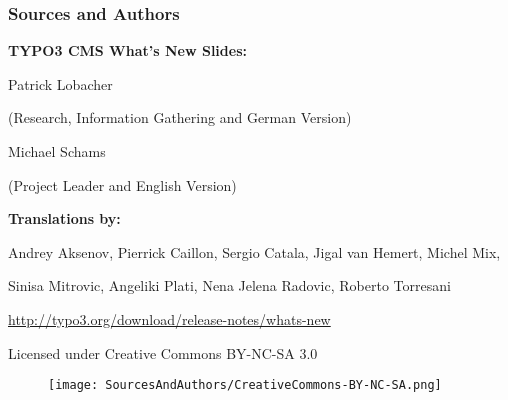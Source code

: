 \begin{frame}[fragile]
	\frametitle{Sources and Authors}

	\vspace{-0.6cm}

	\centerline{\textbf{TYPO3 CMS What's New Slides:}}

	\begin{center}
		\smaller
			\centerline{Patrick Lobacher}
			\centerline{(Research, Information Gathering and German Version)}
			\vspace{0.1cm}
			\centerline{Michael Schams}
			\centerline{(Project Leader and English Version)}
		\normalsize
	\end{center}
	\vspace{-0.6cm}
	\begin{center}
		\smaller
			\centerline{\textbf{Translations by:}}
			\centerline{Andrey Aksenov, Pierrick Caillon, Sergio Catala, Jigal van Hemert, Michel Mix,}
			\centerline{Sinisa Mitrovic, Angeliki Plati, Nena Jelena Radovic, Roberto Torresani}
		\normalsize
	\end{center}
	\vspace{-0.6cm}
	\smaller\begin{center}\url{http://typo3.org/download/release-notes/whats-new}\end{center}\normalsize

	\smaller\begin{center}Licensed under Creative Commons BY-NC-SA 3.0\end{center}\normalsize
	\begin{figure}\vspace*{-0.3cm}
		\texttt{[image: SourcesAndAuthors/CreativeCommons-BY-NC-SA.png]}
	\end{figure}

\end{frame}

